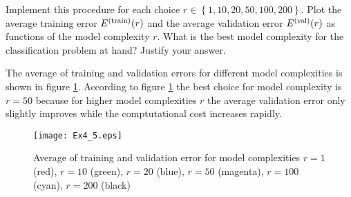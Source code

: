 \documentclass[article,11pt]{article}
\begin{document}
Implement this procedure for each choice $r \in \left\lbrace 1,10,20,50,100,200  \right\rbrace $.  
Plot the average training error $E^{(\rm train)}(r)$ and the average validation error $E^{(\rm val)}(r)$ 
as functions of the model complexity $r$. What is the best model complexity for the classification problem at hand? Justify your answer.

The average of training and validation errors for different model complexities is shown in figure \ref{fig:model_complexity}. According
to figure \ref{fig:model_complexity} the best choice for model complexity is
$r=50$ because for higher model complexities $r$ the average validation error
only slightly improves while the comptutational cost increases rapidly.
\begin{figure}[!h]
  \centering
  \texttt{[image: Ex4\_5.eps]}
  \caption{Average of training and validation error for model complexities
    $r=1$ (red), $r=10$ (green), $r=20$ (blue), $r=50$ (magenta), $r=100$ (cyan), $r=200$ (black)}
  \label{fig:model_complexity}
\end{figure}
\end{document}

